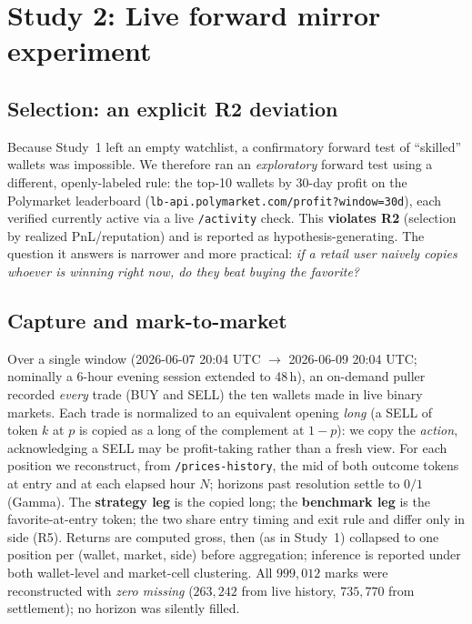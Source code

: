 \documentclass[11pt]{article}
\begin{document}
\section{Study 2: Live forward mirror experiment}
\subsection{Selection: an explicit R2 deviation}\label{sec:selection}
Because Study~1 left an empty watchlist, a confirmatory forward test of ``skilled'' wallets was
impossible. We therefore ran an \emph{exploratory} forward test using a different,
openly-labeled rule: the top-10 wallets by 30-day profit on the Polymarket leaderboard
(\texttt{lb-api.polymarket.com/profit?window=30d}), each verified currently active via a live
\texttt{/activity} check. This \textbf{violates R2} (selection by realized PnL/reputation) and is
reported as hypothesis-generating. The question it answers is narrower and more practical:
\emph{if a retail user naively copies whoever is winning right now, do they beat buying the
favorite?}

\subsection{Capture and mark-to-market}
Over a single window (2026-06-07 20:04 UTC $\to$ 2026-06-09 20:04 UTC; nominally a 6-hour
evening session extended to 48\,h), an on-demand puller recorded \emph{every} trade (BUY and
SELL) the ten wallets made in live binary markets. Each trade is normalized to an equivalent
opening \emph{long} (a SELL of token $k$ at $p$ is copied as a long of the complement at $1-p$):
we copy the \emph{action}, acknowledging a SELL may be profit-taking rather than a fresh view.
For each position we reconstruct, from \texttt{/prices-history}, the mid of both outcome tokens
at entry and at each elapsed hour $N$; horizons past resolution settle to $0/1$ (Gamma). The
\textbf{strategy leg} is the copied long; the \textbf{benchmark leg} is the favorite-at-entry
token; the two share entry timing and exit rule and differ only in side (R5). Returns are
computed gross, then (as in Study~1) collapsed to one position per (wallet, market, side)
before aggregation; inference is reported under both wallet-level and market-cell clustering.
All $999{,}012$ marks were reconstructed with \emph{zero missing} ($263{,}242$ from live
history, $735{,}770$ from settlement); no horizon was silently filled.
\end{document}
